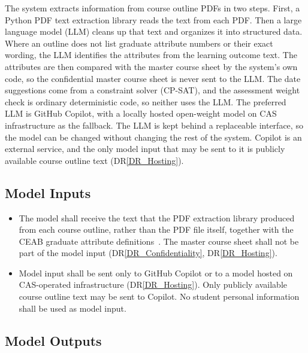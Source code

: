 \documentclass[12pt]{article}
\newcommand{\drref}[1]{DR\ref{#1}}
\newcounter{airnum} %
\begin{document}
\noindent The system extracts information from course outline PDFs in two steps. First, a Python PDF text extraction library reads the text from each PDF. Then a large language model (LLM) cleans up that text and organizes it into structured data. Where an outline does not list graduate attribute numbers or their exact wording, the LLM identifies the attributes from the learning outcome text. The attributes are then compared with the master course sheet by the system's own code, so the confidential master course sheet is never sent to the LLM. The date suggestions come from a constraint solver (CP-SAT), and the assessment weight check is ordinary deterministic code, so neither uses the LLM. The preferred LLM is GitHub Copilot, with a locally hosted open-weight model on CAS infrastructure as the fallback. The LLM is kept behind a replaceable interface, so the model can be changed without changing the rest of the system. Copilot is an external service, and the only model input that may be sent to it is publicly available course outline text (\drref{DR_Hosting}).

\subsection{Model Inputs}

\begin{itemize}
\item[AIR\refstepcounter{airnum}\theairnum \label{AIR_Input_Text}:] The model shall receive the text that the PDF extraction library produced from each course outline, rather than the PDF file itself, together with the CEAB graduate attribute definitions~\citep{CEAB2025}. The master course sheet shall not be part of the model input (\drref{DR_Confidentiality}, \drref{DR_Hosting}).
\item[AIR\refstepcounter{airnum}\theairnum \label{AIR_Input_Privacy}:] Model input shall be sent only to GitHub Copilot or to a model hosted on CAS-operated infrastructure (\drref{DR_Hosting}). Only publicly available course outline text may be sent to Copilot. No student personal information shall be used as model input.
\end{itemize}

\subsection{Model Outputs}
\end{document}
